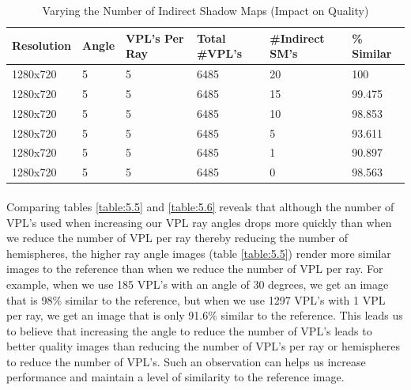 \begin{table}[h!]
	\caption{Varying the Number of Indirect Shadow Maps (Impact on Quality)}
	\begin{center}
	    \begin{tabular}{ | l | l | l | l | l | l |}
	    \hline
	    Resolution & Angle & VPL's Per Ray & Total \#VPL's & \#Indirect SM's & \% Similar\\ \hline
	    1280x720 & 5 & 5 & 6485 & 20 & 100\\ \hline
	    1280x720 & 5 & 5 & 6485 & 15 & 99.475\\ \hline
	    1280x720 & 5 & 5 & 6485 & 10 & 98.853\\ \hline
	    1280x720 & 5 & 5 & 6485 & 5 & 93.611\\ \hline
	    1280x720 & 5 & 5 & 6485 & 1 & 90.897\\ \hline
	    1280x720 & 5 & 5 & 6485 & 0 & 98.563\\ \hline
	    \end{tabular}
	\end{center}
	\label{table:5.8}
\end{table}

\paragraph{}
Comparing tables \ref{table:5.5} and \ref{table:5.6} reveals that although the number of VPL's used when increasing our VPL ray angles drops more quickly than when we reduce the number of VPL per ray thereby reducing the number of hemispheres, the higher ray angle images (table \ref{table:5.5}) render more similar images to the reference than when we reduce the number of VPL per ray.  For example, when we use 185 VPL's with an angle of 30 degrees, we get an image that is 98\% similar to the reference, but when we use 1297 VPL's with 1 VPL per ray, we get an image that is only 91.6\% similar to the reference.  This leads us to believe that increasing the angle to reduce the number of VPL's leads to better quality images than reducing the number of VPL's per ray or hemispheres to reduce the number of VPL's.  Such an observation can helps us increase performance and maintain a level of similarity to the reference image.

